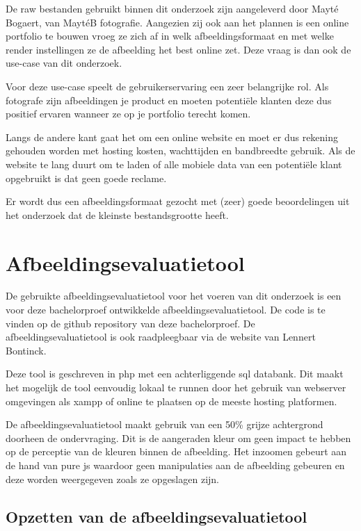 De \gls{raw} bestanden gebruikt binnen dit onderzoek zijn aangeleverd door Mayté Bogaert, van MaytéB fotografie. Aangezien zij ook aan het plannen is een online portfolio te bouwen vroeg ze zich af in welk \gls{afbeeldingsformaat} en met welke \gls{render} instellingen ze de afbeelding het best online zet. Deze vraag is dan ook de \gls{use-case} van dit onderzoek.

Voor deze \gls{use-case} speelt de gebruikerservaring een zeer belangrijke rol. Als fotografe zijn afbeeldingen je product en moeten potentiële klanten deze dus positief ervaren wanneer ze op je portfolio terecht komen.

Langs de andere kant gaat het om een online website en moet er dus rekening gehouden worden met \gls{hosting} kosten, wachttijden en \gls{bandbreedte} gebruik. Als de website te lang duurt om te laden of alle mobiele data van een potentiële klant opgebruikt is dat geen goede reclame.

Er wordt dus een \gls{afbeeldingsformaat} gezocht met (zeer) goede beoordelingen uit het onderzoek dat de kleinste bestandsgrootte heeft.

\section{Afbeeldingsevaluatietool}
\label{sec:onderzoek-evaluatietool}

De gebruikte \gls{afbeeldingsevaluatietool} voor het voeren van dit onderzoek is een voor deze bachelorproef ontwikkelde \gls{afbeeldingsevaluatietool}. De code is te vinden op de \gls{github} repository van deze bachelorproef. De \gls{afbeeldingsevaluatietool} is ook raadpleegbaar via de website van Lennert Bontinck.

Deze tool is geschreven in \gls{php} met een achterliggende \gls{sql} databank. Dit maakt het mogelijk de tool eenvoudig lokaal te runnen door het gebruik van webserver omgevingen als \gls{xampp} of online te plaatsen op de meeste \gls{hosting} platformen.

De \gls{afbeeldingsevaluatietool} maakt gebruik van een 50\% grijze achtergrond doorheen de ondervraging. Dit is de aangeraden kleur om geen impact te hebben op de perceptie van de kleuren binnen de afbeelding. Het inzoomen gebeurt aan de hand van pure \gls{js} waardoor geen manipulaties aan de afbeelding gebeuren en deze worden weergegeven zoals ze opgeslagen zijn. 

\subsection{Opzetten van de afbeeldingsevaluatietool}
\label{sec:onderzoek-evaluatietool-setup}

